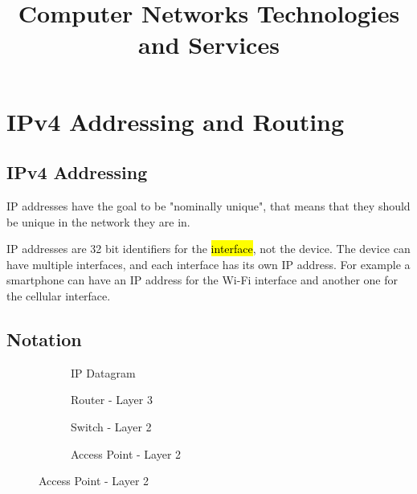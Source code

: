

\title{Computer Networks Technologies and Services}

\maketitle
\tableofcontents

\section{IPv4 Addressing and Routing}

\subsection{IPv4 Addressing}

IP addresses have the goal to be "nominally unique", that means that they should be unique in the network they are in.

IP addresses are 32 bit identifiers for the \hl{interface}, not the device. The device can have multiple interfaces, and each interface has its own IP address. For example a smartphone can have an IP address for the Wi-Fi interface and another one for the cellular interface.

\subsection{Notation}

\begin{figure}[htb]
  \centering
  \begin{subfigure}[b]{0.45\textwidth}
    \centering
    
    \caption{IP Datagram}
  \end{subfigure}
  \hfill
  \begin{subfigure}[b]{0.45\textwidth}
    \centering
    
    \caption{Router - Layer 3}
  \end{subfigure}

  \vspace{1em}

  \begin{subfigure}[b]{0.45\textwidth}
    \centering
    
    \caption{Switch - Layer 2}
  \end{subfigure}
  \hfill
  \begin{subfigure}[b]{0.45\textwidth}
    \centering
    
    \caption{Access Point - Layer 2}
  \end{subfigure}
\end{figure}

